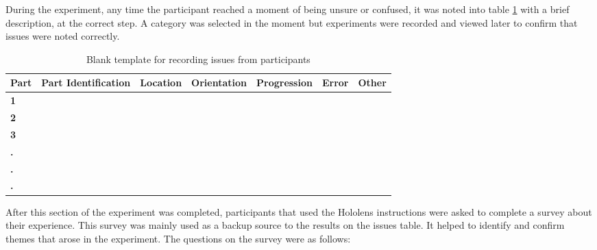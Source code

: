 \documentclass{l4proj}
\begin{document}
During the experiment, any time the participant reached a moment of being unsure or confused, it was noted into table \ref{tab:blankissues} with a brief description, at the correct step. A category was selected in the moment but experiments were recorded and viewed later to confirm that issues were noted correctly.
    \begin{table}[!ht]
         \caption{
         Blank template for recording issues from participants
         }\label{tab:blankissues}
        \centering
        \begin{tabular}{@{}l|llllll@{}}
            \textbf{Part} & \textbf{Part Identification} & \textbf{Location} & \textbf{Orientation} & \textbf{Progression}  & \textbf{Error} & \textbf{Other} \\ \hline
            \textbf{1}  & ~ & ~ & ~ & ~ & ~ & ~ \\ 
            \textbf{2}  & ~ & ~ & ~ & ~ & ~ & ~ \\ 
            \textbf{3}  & ~ & ~ & ~ & ~ & ~ & ~ \\ 
            \textbf{.}  & ~ & ~ & ~ & ~ & ~ & ~ \\ 
            \textbf{.}  & ~ & ~ & ~ & ~ & ~ & ~ \\ 
            \textbf{.}  & ~ & ~ & ~ & ~ & ~ & ~ \\ 
        \end{tabular}
    \end{table}

After this section of the experiment was completed, participants that used the Hololens instructions were asked to complete a survey about their experience. This survey was mainly used as a backup source to the results on the issues table. It helped to identify and confirm themes that arose in the experiment. The questions on the survey were as follows:
\end{document}
